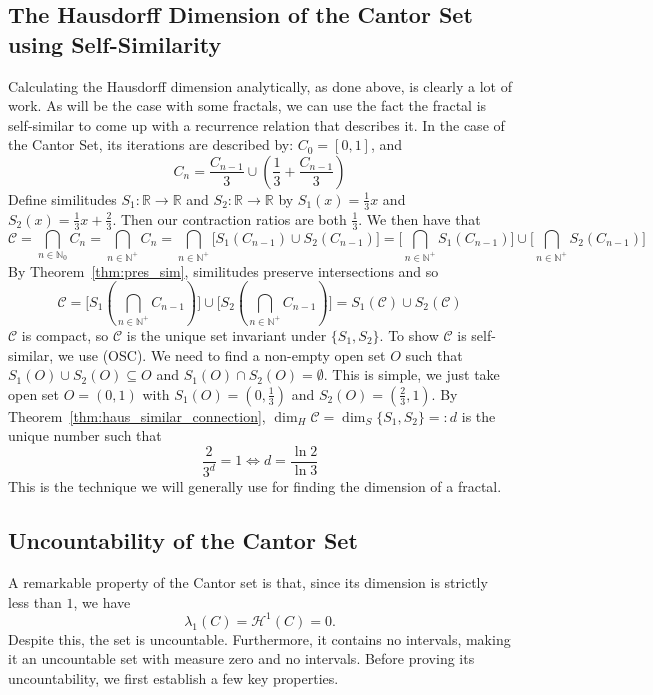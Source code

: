 \documentclass{article}
\theoremstyle{plain}
\theoremstyle{definition}
\theoremstyle{remark}
\begin{document}
\subsection{The Hausdorff Dimension of the Cantor Set using Self-Similarity}
Calculating the Hausdorff dimension analytically, as done above, is clearly a lot of work. As will be the case with some fractals, we can use the fact the fractal is self-similar to come up with a recurrence relation that describes it. In the case of the Cantor Set, its iterations are described by: $C_0 = [0,1]$, and 
\[
C_n = \frac{C_{n-1}}{3} \cup \left (\frac{1}{3}  + \frac{C_{n-1}}{3}\right)
\]
Define similitudes $S_1:\mathbb{R} \to \mathbb{R}$ and $S_2:\mathbb{R} \to \mathbb{R}$ by $S_1(x) = \frac{1}{3}x$ and $S_2(x) = \frac{1}{3}x + \frac{2}{3}$. Then our contraction ratios are both $\frac{1}{3}$. We then have that \[
\mathcal{C} = \bigcap \limits _{n \in \mathbb{N}_0} C_n = \bigcap \limits _{n \in \mathbb{N}^+}C_n = \bigcap \limits _{n \in \mathbb{N}^+}\big [ S_1(C_{n-1}) \cup S_2(C_{n-1})\big] = \bigg [ \bigcap \limits _{n \in \mathbb{N}^+}S_1(C_{n-1})\bigg ] \cup \bigg [ \bigcap \limits _{n \in \mathbb{N}^+}S_2(C_{n-1})\bigg ] \]By Theorem~\ref{thm:pres_sim}, similitudes preserve intersections and so \[
\mathcal{C} = 
\bigg [ S_1 \left ( \bigcap \limits _{n \in \mathbb{N}^+}C_{n-1} \right )\bigg ] \cup \bigg [ S_2 \left ( \bigcap \limits _{n \in \mathbb{N}^+} C_{n-1} \right )\bigg ] = S_1 (\mathcal{C}) \cup S_2(\mathcal{C})
\] $\mathcal{C}$ is compact, so $\mathcal{C}$ is the unique set invariant under $\{S_1, S_2\}$. To show $\mathcal{C}$ is self-similar, we use (OSC). We need to find a non-empty open set $O$ such that $S_1(O) \cup S_2(O) \subseteq O$ and $S_1 (O) \cap S_2(O) = \emptyset$. This is simple, we just take open set $O = (0,1)$ with $S_1(O) = \left (0, \frac{1}{3}\right)$ and $S_2(O) = \left (\frac{2}{3}, 1 \right )$. By Theorem~\ref{thm:haus_similar_connection}, $\dim_H \mathcal{C} = \dim _S \{S_1,S_2\} =: d$ is the unique number such that \[\frac{2}{3^d} = 1 \iff d = \frac{\ln 2}{\ln 3}\]
This is the technique we will generally use for finding the dimension of a fractal.

\subsection{Uncountability of the Cantor Set}

A remarkable property of the Cantor set is that, since its dimension is strictly less than $1$, we have 
\[
\lambda_{1}(C) = \mathcal{H}^{1}(C) = 0.
\] 
Despite this, the set is uncountable. Furthermore, it contains no intervals, making it an uncountable set with measure zero and no intervals. Before proving its uncountability, we first establish a few key properties.
\end{document}
